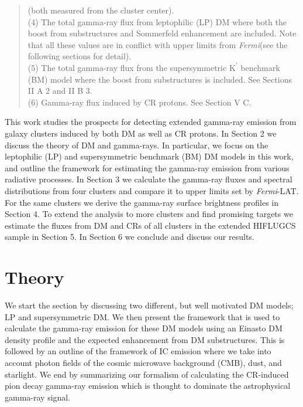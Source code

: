 \documentclass[10pt,aps,pra,reprint,amsmath,amsfonts,amssymb,showpacs,nofootinbib,floatfix]{revtex4-1}
\newcommand{\Fermi}{{\em Fermi}\xspace}
\newcommand{\rmn}{\mathrm}
\newcommand{\Kp}{\rmn{K}^\prime}
\begin{document}
\begin{table}
\begin{minipage}{2.0\columnwidth}
\begin{quote}
  (both measured from the cluster center).\\
  (4) The total gamma-ray flux from leptophilic (LP) DM where both the
  boost from substructures and Sommerfeld enhancement are
  included. Note that all these values are in conflict with upper limits from
  \Fermi (see the following sections for detail).\\
  (5) The total gamma-ray flux from the supersymmetric $\Kp$ benchmark (BM) 
  model where the boost from substructures is included. See Sections II A 2 and II B 3.\\
  (6) Gamma-ray flux induced by CR protons. See Section V C. 
 \label{tab:flux_tab}
  \end{quote}
\end{minipage}
\end{table} 

This work studies the prospects for detecting extended gamma-ray
emission from galaxy clusters induced by both DM as well as CR
protons. In Section 2 we discuss the theory of DM and gamma-rays. In
particular, we focus on the leptophilic (LP) and supersymmetric
benchmark (BM) DM models in this work, and outline the framework
for estimating the gamma-ray emission from various radiative
processes. In Section 3 we calculate the gamma-ray fluxes and spectral
distributions from four clusters and compare it to upper limits set by
\Fermi-LAT. For the same clusters we derive the gamma-ray surface
brightness profiles in Section 4. To extend the analysis to more
clusters and find promising targets we estimate the fluxes from DM and
CRs of all clusters in the extended HIFLUGCS sample in Section 5. In
Section 6 we conclude and discuss our results.

\section{Theory}
\label{sect:theory}
We start the section by discussing two different, but well motivated
DM models; LP and supersymmetric DM. We then present the framework
that is used to calculate the gamma-ray emission for these DM models
using an Einasto DM density profile and the expected enhancement from
DM substructures. This is followed by an outline of the framework of
IC emission where we take into account photon fields of the cosmic
microwave background (CMB), dust, and starlight. We end by summarizing
our formalism of calculating the CR-induced pion decay gamma-ray
emission which is thought to dominate the astrophysical gamma-ray
signal.
\end{document}
